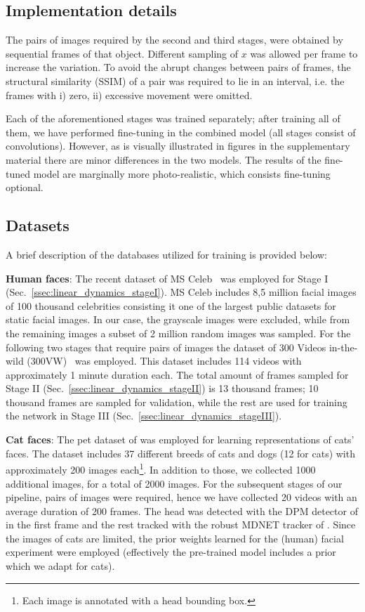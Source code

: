 \documentclass[10pt,twocolumn,letterpaper]{article}
\begin{document}
\subsection{Implementation details}
The pairs of images required by the second and third stages, were obtained by sequential frames of that object. Different sampling of $x$ was allowed per frame to increase the variation. To avoid the abrupt changes between pairs of frames, the structural similarity (SSIM) of a pair was required to lie in an interval, i.e. the frames with i) zero, ii) excessive movement were omitted. 

%
Each of the aforementioned stages was trained separately; after training all of them, we have performed fine-tuning in the combined model (all stages consist of convolutions). However, as is visually illustrated in figures in the supplementary material there are minor differences in the two models. The results of the fine-tuned model are marginally more photo-realistic, which consists fine-tuning optional.

\subsection{Datasets}\label{ssec:linear_dynamics_dataset}
A brief description of the databases utilized for training is provided below: 

\textbf{Human faces}: The recent dataset of MS Celeb~\cite{guo2016ms} was employed for Stage I (Sec.~\ref{ssec:linear_dynamics_stageI}). MS Celeb includes 8,5 million facial images of 100 thousand celebrities consisting it one of the largest public datasets for static facial images. In our case, the grayscale images were excluded, while from the remaining images a subset of 2 million random images was sampled. For the following two stages that require pairs of images the dataset of 300 Videos in-the-wild (300VW)~\cite{shen2015first} was employed. This dataset includes 114 videos with approximately 1 minute duration each. The total amount of frames sampled for Stage II  (Sec.~\ref{ssec:linear_dynamics_stageII}) is 13 thousand frames; 10 thousand frames are sampled for validation, while the rest are used for training the network in Stage III (Sec.~\ref{ssec:linear_dynamics_stageIII}).  

\textbf{Cat faces}: The pet dataset of \cite{parkhi2012cats} was employed for learning representations of cats' faces. The dataset includes 37 different breeds of cats and dogs (12 for cats) with approximately 200 images each\footnote{Each image is annotated with a head bounding box.}. In addition to those, we collected 1000 additional images, for a total of 2000 images. For the subsequent stages of our pipeline, pairs of images were required, hence we have collected 20 videos with an average duration of 200 frames. The head was detected with the DPM detector of \cite{felzenszwalb2010object} in the first frame and the rest tracked with the robust MDNET tracker of \cite{nam2016mdnet}. Since the images of cats are limited, the prior weights learned for the (human) facial experiment were employed (effectively the pre-trained model includes a prior which we adapt for cats).
\end{document}
